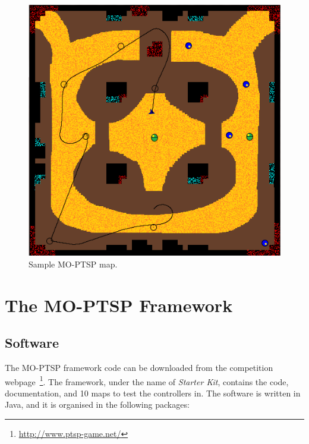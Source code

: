 \documentclass[conference]{IEEEtran}
\begin{document}
\begin{figure} [!h]
	\begin{center}
	\includegraphics[scale=0.5]{img/sampleMap}
	\caption{Sample MO-PTSP map.}
	\label{fig:sampleMap}
	\end{center}
\end{figure}


\section{The MO-PTSP Framework} \label{sec:contr}


\subsection{Software} \label{ssec:software}

The MO-PTSP framework code can be downloaded from the competition webpage~\footnote{\url{http://www.ptsp-game.net/}}. The framework, under the name of \textit{Starter Kit}, contains the code, documentation, and 10 maps to test the controllers in. The software is written in Java, and it is organised in the following packages:
\end{document}
